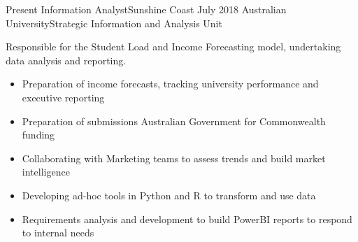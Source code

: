 %
%
%

\begin{experiences}
  \consultantexperience
    {Present}   {Information Analyst}{}{Sunshine Coast}
    {July 2018}  {Australian University}{Strategic Information and Analysis Unit}
    {Responsible for the Student Load and Income Forecasting model, undertaking data analysis and reporting.
                      \begin{itemize}
		\item Preparation of income forecasts, tracking university performance and executive reporting
		\item Preparation of submissions Australian Government for Commonwealth funding
		\item Collaborating with Marketing teams to assess trends and build market intelligence 
		\item Developing ad-hoc tools in Python and R to transform and use data
		\item Requirements analysis and development to build PowerBI reports to respond to internal needs
                                                              

\end{itemize}}
\end{experiences}
